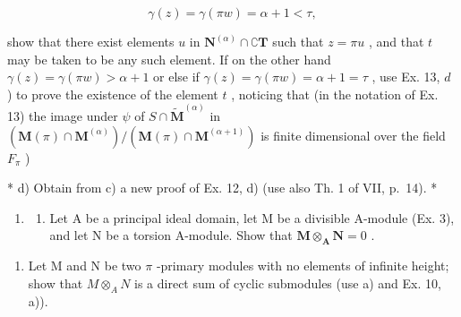 \[
\gamma (z) = \gamma (\pi w) = \alpha + 1 <   \tau ,
\]

show that there exist elements \(u\) in \(\mathbf{N}^{(\alpha)} \cap \complement \mathbf{T}\) such that \(z = \pi u\) , and that \(t\) may be taken to be any such element. If on the other hand \(\gamma(z) = \gamma(\pi w) > \alpha + 1\) or else if \(\gamma(z) = \gamma(\pi w) = \alpha + 1 = \tau\) , use Ex. 13, \(d\) ) to prove the existence of the element \(t\) , noticing that (in the notation of Ex. 13) the image under \(\psi\) of \(S \cap \tilde{\mathbf{M}}^{(\alpha)}\) in \((\mathbf{M}(\pi) \cap \mathbf{M}^{(\alpha)}) / (\mathbf{M}(\pi) \cap \mathbf{M}^{(\alpha + 1)})\) is finite dimensional over the field \(F_{\pi}\) )

* d) Obtain from c) a new proof of Ex. 12, d) (use also Th. 1 of VII, p.~14). *

\begin{enumerate}
\def\labelenumi{\arabic{enumi})}
\setcounter{enumi}{14}
\tightlist
\item
  \begin{enumerate}
  \def\labelenumii{\alph{enumii})}
  \tightlist
  \item
    Let A be a principal ideal domain, let M be a divisible A-module (Ex. 3), and let N be a torsion A-module. Show that \(\mathbf{M} \otimes_{\mathbf{A}} \mathbf{N} = 0\) .
  \end{enumerate}
\end{enumerate}

\begin{enumerate}
\def\labelenumi{\alph{enumi})}
\setcounter{enumi}{1}
\tightlist
\item
  Let M and N be two \(\pi\) -primary modules with no elements of infinite height; show that \(M \otimes_{A} N\) is a direct sum of cyclic submodules (use a) and Ex. 10, a)).
\end{enumerate}

